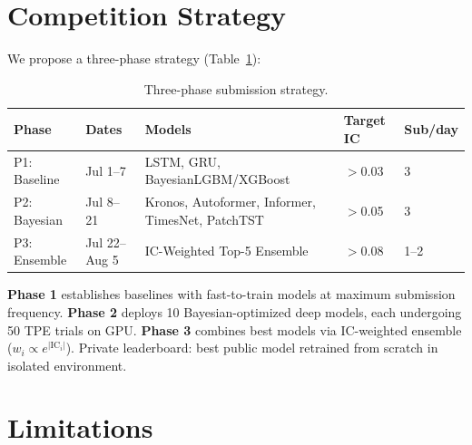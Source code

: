\documentclass[sigconf,10pt]{acmart}
\begin{document}
\section{Competition Strategy}

We propose a three-phase strategy (Table~\ref{tab:strategy}):

\begin{table}[htbp]
\centering
\caption{Three-phase submission strategy.}
\label{tab:strategy}
\begin{tabular}{@{}lllll@{}}
\toprule
\textbf{Phase} & \textbf{Dates} & \textbf{Models} & \textbf{Target IC} & \textbf{Sub/day} \\
\midrule
P1: Baseline    & Jul 1--7   & LSTM, GRU, BayesianLGBM/XGBoost & $>$0.03 & 3 \\
P2: Bayesian    & Jul 8--21  & Kronos, Autoformer, Informer, TimesNet, PatchTST & $>$0.05 & 3 \\
P3: Ensemble    & Jul 22--Aug 5 & IC-Weighted Top-5 Ensemble & $>$0.08 & 1--2 \\
\bottomrule
\end{tabular}
\end{table}

\textbf{Phase 1} establishes baselines with fast-to-train models at maximum submission frequency. \textbf{Phase 2} deploys 10 Bayesian-optimized deep models, each undergoing 50 TPE trials on GPU. \textbf{Phase 3} combines best models via IC-weighted ensemble ($w_i \propto e^{|\text{IC}_i|}$). Private leaderboard: best public model retrained from scratch in isolated environment.

\section{Limitations}
\end{document}

